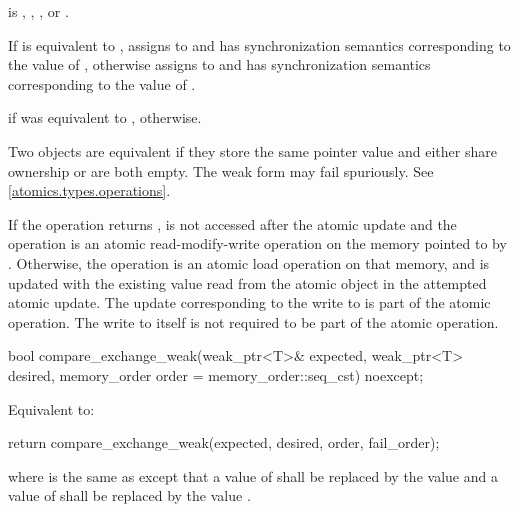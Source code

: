 \begin{itemdescr}
\pnum
\expects
{} is
,
,
, or
.

\pnum
\effects
If  is equivalent to ,
assigns  to  and
has synchronization semantics corresponding to the value of ,
otherwise assigns  to  and
has synchronization semantics corresponding to the value of .

\pnum
\returns
{} if  was equivalent to ,
 otherwise.

\pnum
\remarks
Two  objects are equivalent if
they store the same pointer value and
either share ownership or are both empty.
The weak form may fail spuriously. See \ref{atomics.types.operations}.

\pnum
If the operation returns ,
 is not accessed after the atomic update and
the operation is an atomic read-modify-write operation
on the memory pointed to by .
Otherwise, the operation is an atomic load operation on that memory, and
 is updated with the existing value
read from the atomic object in the attempted atomic update.
The  update corresponding to the write to 
is part of the atomic operation.
The write to  itself
is not required to be part of the atomic operation.
\end{itemdescr}

%
\begin{itemdecl}
bool compare_exchange_weak(weak_ptr<T>& expected, weak_ptr<T> desired,
                           memory_order order = memory_order::seq_cst) noexcept;
\end{itemdecl}

\begin{itemdescr}
\pnum
\effects
Equivalent to:
\begin{codeblock}
return compare_exchange_weak(expected, desired, order, fail_order);
\end{codeblock}
where  is the same as 
except that a value of 
shall be replaced by the value  and
a value of 
shall be replaced by the value .
\end{itemdescr}

